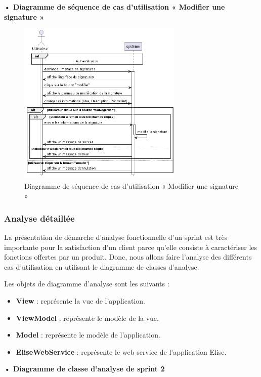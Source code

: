 \textbf{•	Diagramme de séquence de cas d'utilisation « Modifier une signature  »}
\begin{figure}[H]
  \centering
  \includegraphics[width=0.7\textwidth]{out/diagrams/signatures/update/update_signature}
  \caption{Diagramme de séquence de cas d'utilisation « Modifier une signature  »}
  \label{fig:sequence_update_signature}
\end{figure}

\subsubsection{Analyse détaillée}
La présentation de démarche d'analyse fonctionnelle d'un sprint est très importante pour la satisfaction d'un client parce qu'elle consiste à caractériser les fonctions offertes par un produit.
Donc, nous allons faire l'analyse des différents cas d'utilisation en utilisant le diagramme de classes d'analyse.

Les objets de diagramme d'analyse sont les suivants :
\begin{itemize}
  \item \textbf{View} : représente la vue de l'application.
  \item \textbf{ViewModel} : représente le modèle de la vue.
  \item \textbf{Model} : représente le modèle de l'application.
  \item \textbf{EliseWebService} : représente le web service de l'application Elise.
\end{itemize}

\textbf{•	Diagramme de classe d'analyse de sprint 2 }
\newpage

